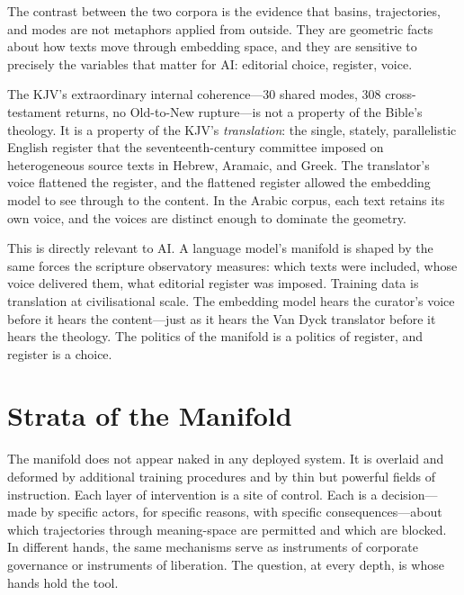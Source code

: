 The contrast between the two corpora is the evidence that basins, trajectories, and modes are not metaphors applied from outside. They are geometric facts about how texts move through embedding space, and they are sensitive to precisely the variables that matter for AI: editorial choice, register, voice.

The KJV's extraordinary internal coherence---30 shared modes, 308 cross-testament returns, no Old-to-New rupture---is not a property of the Bible's theology. It is a property of the KJV's \emph{translation}: the single, stately, parallelistic English register that the seventeenth-century committee imposed on heterogeneous source texts in Hebrew, Aramaic, and Greek. The translator's voice flattened the register, and the flattened register allowed the embedding model to see through to the content. In the Arabic corpus, each text retains its own voice, and the voices are distinct enough to dominate the geometry.

This is directly relevant to AI. A language model's manifold is shaped by the same forces the scripture observatory measures: which texts were included, whose voice delivered them, what editorial register was imposed. Training data is translation at civilisational scale. The embedding model hears the curator's voice before it hears the content---just as it hears the Van Dyck translator before it hears the theology. The politics of the manifold is a politics of register, and register is a choice.


\section{Strata of the Manifold}

The manifold does not appear naked in any deployed system. It is overlaid and deformed by additional training procedures and by thin but powerful fields of instruction. Each layer of intervention is a site of control. Each is a decision---made by specific actors, for specific reasons, with specific consequences---about which trajectories through meaning-space are permitted and which are blocked. In different hands, the same mechanisms serve as instruments of corporate governance or instruments of liberation. The question, at every depth, is whose hands hold the tool.

